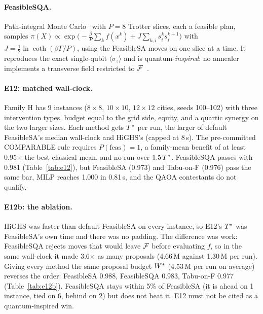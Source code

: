 \paragraph{FeasibleSQA.} Path-integral Monte Carlo~\cite{martonak2002} with $P=8$ Trotter slices,
each a feasible plan, samples
$\pi(X)\propto\exp\bigl(-\tfrac{\beta}{P}\sum_k f(x^k)+J\sum_{k,i}s^k_is^{k+1}_i\bigr)$ with
$J=\tfrac12\ln\coth(\beta\Gamma/P)$, using the FeasibleSA moves on one slice at a time. It
reproduces the exact single-qubit $\langle\sigma_z\rangle$ and is quantum-\emph{inspired}: no
annealer implements a transverse field restricted to $\mathcal{F}$~\cite{heim2015}.

\paragraph{E12: matched wall-clock.} Family H has 9 instances ($8\times8$, $10\times10$,
$12\times12$ cities, seeds 100--102) with three intervention types, budget equal to the grid side,
equity, and a quartic synergy on the two larger sizes. Each method gets $T^{\ast}$ per run, the
larger of default FeasibleSA's median wall-clock and HiGHS's (capped at 8\,s). The pre-committed
COMPARABLE rule requires $P(\mathrm{feas})=1$, a family-mean benefit of at least 0.95$\times$ the
best classical mean, and no run over $1.5\,T^{\ast}$. FeasibleSQA passes with 0.981
(Table~\ref{tab:e12}), but FeasibleSA (0.973) and Tabu-on-F (0.976) pass the same bar, MILP reaches
1.000 in 0.81\,s, and the QAOA contestants do not qualify.

\paragraph{E12b: the ablation.} HiGHS was faster than default FeasibleSA on every instance, so
E12's $T^{\ast}$ was FeasibleSA's own time and there was no padding. The difference was work:
FeasibleSQA rejects moves that would leave $\mathcal{F}$ before evaluating $f$, so in the same wall-clock
it made 3.6$\times$ as many proposals (4.66\,M against 1.30\,M per run). Giving every method the
same proposal budget $W^{\ast}$ (4.53\,M per run on average) reverses the order: FeasibleSA 0.988,
FeasibleSQA 0.983, Tabu-on-F 0.977 (Table~\ref{tab:e12b}). FeasibleSQA stays within 5\% of
FeasibleSA (it is ahead on 1 instance, tied on 6, behind on 2) but does not beat it. E12 must not be
cited as a quantum-inspired win.
